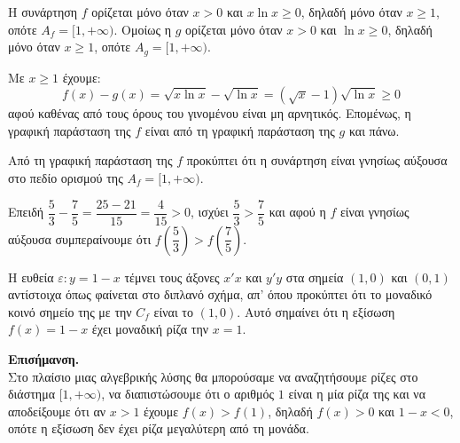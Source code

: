 \begin{alist}
\item Η συνάρτηση $f$ ορίζεται μόνο όταν $x > 0$ και $x\ln x \ge 0$, δηλαδή μόνο όταν $x \ge 1$, οπότε $A_f = [1, +\infty)$. Ομοίως η $g$ ορίζεται μόνο όταν $x > 0$ και $\ln x \ge 0$, δηλαδή μόνο όταν $x \ge 1$, οπότε $A_g = [1, +\infty)$.
\item Με $x \ge 1$ έχουμε:
\[f(x) - g(x) = \sqrt{x\ln x} - \sqrt{\ln x} = (\sqrt{x} - 1)\sqrt{\ln x} \ge 0\]
αφού καθένας από τους όρους του γινομένου είναι μη αρνητικός. Επομένως, η γραφική παράσταση της $f$ είναι από τη γραφική παράσταση της $g$ και πάνω.
\item 
\begin{rlist}
\item Από τη γραφική παράσταση της $f$ προκύπτει ότι η συνάρτηση είναι γνησίως αύξουσα στο πεδίο ορισμού της $A_f = [1, +\infty)$.
\item Επειδή $\dfrac{5}{3} - \dfrac{7}{5} = \dfrac{25 - 21}{15} = \dfrac{4}{15} > 0$, ισχύει $\dfrac{5}{3} > \dfrac{7}{5}$ και αφού η $f$ είναι γνησίως αύξουσα συμπεραίνουμε ότι $f\left(\dfrac{5}{3}\right) > f\left(\dfrac{7}{5}\right)$.
\end{rlist}
\item Η ευθεία $\varepsilon: y = 1 - x$ τέμνει τους άξονες $x'x$ και $y'y$ στα σημεία $(1,0)$ και $(0,1)$ αντίστοιχα όπως φαίνεται στο διπλανό σχήμα, απ' όπου προκύπτει ότι το μοναδικό κοινό σημείο της με την $C_f$ είναι το $(1,0)$. Αυτό σημαίνει ότι η εξίσωση $f(x) = 1 - x$ έχει μοναδική ρίζα την $x = 1$.
\end{alist}
\textbf{Επισήμανση.} \\
Στο πλαίσιο μιας αλγεβρικής λύσης θα μπορούσαμε να αναζητήσουμε ρίζες στο διάστημα $[1, +\infty)$, να διαπιστώσουμε ότι ο αριθμός $1$ είναι η μία ρίζα της και να αποδείξουμε ότι αν $x > 1$ έχουμε $f(x) > f(1)$, δηλαδή $f(x) > 0$ και $1 - x < 0$, οπότε η εξίσωση δεν έχει ρίζα μεγαλύτερη από τη μονάδα.

